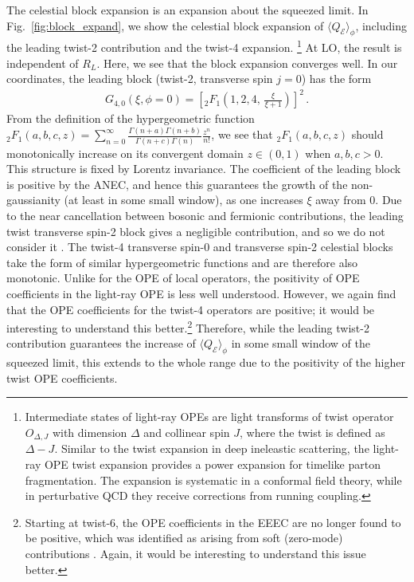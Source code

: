 \documentclass[letterpaper,11pt]{article}
\def\Fig#1{Fig.~{\ref{#1}}}
\DeclareRobustCommand{\Fig}[1]{Fig.~\ref{#1}}
\def\cE{\mathcal{E}}
\def\cE{\mathcal{E}}
\begin{document}
The celestial block expansion is an expansion about the squeezed limit.
%
In \Fig{fig:block_expand}, we show the celestial block expansion of $\langle Q_{\cE}\rangle_\phi$, including the leading twist-2 contribution and the twist-4 expansion.%
%
\footnote{
Intermediate states of light-ray OPEs are light transforms of twist operator $O_{\Delta, J}$ with dimension $\Delta$ and collinear spin $J$, where the twist is defined as $\Delta - J$. Similar to the twist expansion in deep ineleastic scattering, the light-ray OPE twist expansion provides a power expansion for timelike parton fragmentation. The expansion is systematic in a conformal field theory, while in perturbative QCD they receive corrections from running coupling. }
%
At LO, the result is independent of $R_L$. Here, we see that the block expansion converges well. In our coordinates, the leading block (twist-2, transverse spin $j=0$) has the form 
\begin{align}
G_{4,0}(\xi, \phi=0)=\left[_2F_1\left(1,2,4,\,\frac{\xi}{\xi+1}\right)\right]^2\,.
\end{align}
From the definition of the hypergeometric function $_2F_1(a,b,c,z) = \sum_{n=0}^{\infty} \frac{\Gamma(n+a) \Gamma(n+b)}{\Gamma(n+c)\Gamma(n)} \frac{z^n}{n!}$, we see that $_2F_1(a,b,c,z)$ should monotonically increase on its convergent domain $z\in (0,1)$ when $a,b,c>0$. This structure is fixed by Lorentz invariance. The coefficient of the leading block is positive by the ANEC, and hence this guarantees the growth of the non-gaussianity (at least in some small window), as one increases $\xi$ away from $0$. Due to the near cancellation between bosonic and fermionic contributions, the leading twist transverse spin-2 block gives a negligible contribution, and so we do not consider it \cite{Chen:2020adz,Chen:2021gdk}. The twist-4 transverse spin-0 and transverse spin-2 celestial blocks take the form of similar hypergeometric functions and are therefore also monotonic. Unlike for the OPE of local operators, the positivity of OPE coefficients in the light-ray OPE is less well understood. However, we again find that the OPE coefficients for the twist-4 operators are positive; it would be interesting to understand this better.\footnote{Starting at twist-6, the OPE coefficients in the EEEC are no longer found to be positive, which was identified as arising from soft (zero-mode) contributions \cite{Chen:2022jhb}. Again, it would be interesting to understand this issue better.} Therefore, while the leading twist-2 contribution guarantees the increase of $\langle Q_{\cE}\rangle_\phi$ in some small window of the squeezed limit, this extends to the whole range due to the positivity of the higher twist OPE coefficients.
\end{document}
